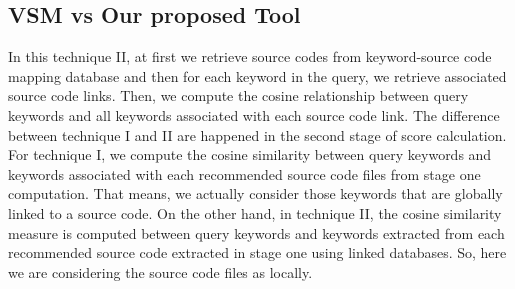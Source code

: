 \documentclass{sig-alternate}
\begin{document}


\subsection{VSM vs Our proposed Tool}
In this technique II, at first we retrieve source codes from keyword-source code mapping database and then for each keyword in the query, we retrieve associated source code links. Then,
we compute the cosine relationship between query keywords and all keywords associated with each source code link. The difference between technique I and II are happened in the second stage of score calculation. For technique I, we compute the cosine similarity between query keywords and keywords associated with each recommended source code files from stage one computation. That means, we actually consider those keywords that are globally linked to a source code. On the other hand, in technique II, the cosine similarity measure is computed between query keywords and keywords extracted from each recommended source code extracted in stage one using linked databases. So, here we are considering the source code files as locally. 
\end{document}
